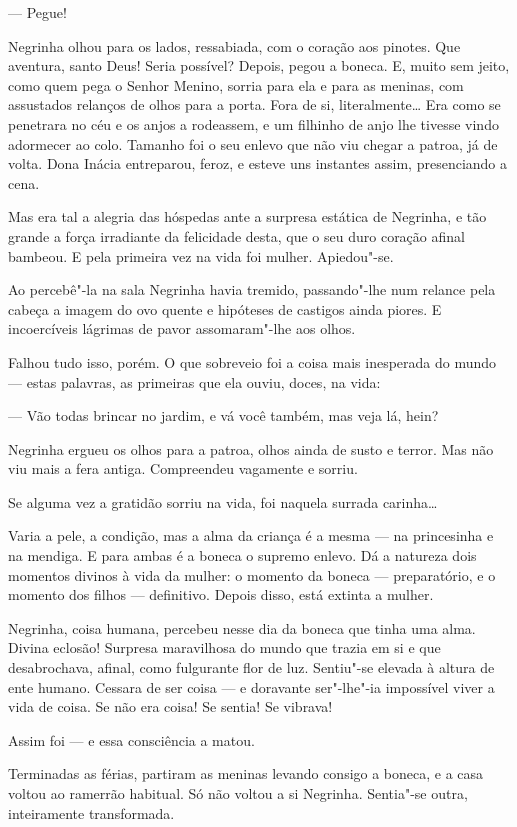 --- Pegue!

Negrinha olhou para os lados, ressabiada, com o coração aos pinotes. Que
aventura, santo Deus! Seria possível? Depois, pegou a boneca. E, muito
sem jeito, como quem pega o Senhor Menino, sorria para ela e para as
meninas, com assustados relanços de olhos para a porta. Fora de si,
literalmente\ldots{} Era como se penetrara no céu e os anjos a rodeassem, e
um filhinho de anjo lhe tivesse vindo adormecer ao colo. Tamanho foi o
seu enlevo que não viu chegar a patroa, já de volta. Dona Inácia
entreparou, feroz, e esteve uns instantes assim, presenciando a cena.

Mas era tal a alegria das hóspedas ante a surpresa estática de Negrinha,
e tão grande a força irradiante da felicidade desta, que o seu duro
coração afinal bambeou. E pela primeira vez na vida foi mulher.
Apiedou"-se.

Ao percebê"-la na sala Negrinha havia tremido, passando"-lhe num relance
pela cabeça a imagem do ovo quente e hipóteses de castigos ainda piores.
E incoercíveis lágrimas de pavor assomaram"-lhe aos olhos.

Falhou tudo isso, porém. O que sobreveio foi a coisa mais inesperada do
mundo --- estas palavras, as primeiras que ela ouviu, doces, na vida:

--- Vão todas brincar no jardim, e vá você também, mas veja lá, hein?

Negrinha ergueu os olhos para a patroa, olhos ainda de susto e terror.
Mas não viu mais a fera antiga. Compreendeu vagamente e sorriu.

Se alguma vez a gratidão sorriu na vida, foi naquela surrada carinha\ldots{}

Varia a pele, a condição, mas a alma da criança é a mesma --- na
princesinha e na mendiga. E para ambas é a boneca o supremo enlevo. Dá a
natureza dois momentos divinos à vida da mulher: o momento da boneca ---
preparatório, e o momento dos filhos --- definitivo. Depois disso, está
extinta a mulher.

Negrinha, coisa humana, percebeu nesse dia da boneca que tinha uma alma.
Divina eclosão! Surpresa maravilhosa do mundo que trazia em si e que
desabrochava, afinal, como fulgurante flor de luz. Sentiu"-se elevada à
altura de ente humano. Cessara de ser coisa --- e doravante ser"-lhe"-ia
impossível viver a vida de coisa. Se não era coisa! Se sentia! Se
vibrava!

Assim foi --- e essa consciência a matou.

Terminadas as férias, partiram as meninas levando consigo a boneca, e a
casa voltou ao ramerrão habitual. Só não voltou a si Negrinha. Sentia"-se
outra, inteiramente transformada.

